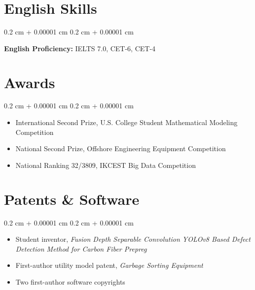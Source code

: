 \documentclass[10pt, letterpaper]{article}
\newenvironment{highlights}{
    \begin{itemize}[
        topsep=0.10 cm,
        parsep=0.10 cm,
        partopsep=0pt,
        itemsep=0pt,
        leftmargin=0.4 cm + 10pt
    ]
}{
    \end{itemize}
} %
\newenvironment{onecolentry}{
    \begin{adjustwidth}{
        0.2 cm + 0.00001 cm
    }{
        0.2 cm + 0.00001 cm
    }
}{
    \end{adjustwidth}
} %
\begin{document}
\section{English Skills}

\begin{onecolentry}
    \textbf{English Proficiency:} IELTS 7.0, CET-6, CET-4
\end{onecolentry}

\section{Awards}

\begin{onecolentry}
    \begin{highlights}
        \item International Second Prize, U.S. College Student Mathematical Modeling Competition
        \item National Second Prize, Offshore Engineering Equipment Competition
        \item National Ranking 32/3809, IKCEST Big Data Competition
    \end{highlights}
\end{onecolentry}

\section{Patents \& Software}

\begin{onecolentry}
    \begin{highlights}
        \item Student inventor, \textit{Fusion Depth Separable Convolution YOLOv8 Based Defect Detection Method for Carbon Fiber Prepreg}
        \item First-author utility model patent, \textit{Garbage Sorting Equipment}
        \item Two first-author software copyrights
    \end{highlights}
\end{onecolentry}
\end{document}
